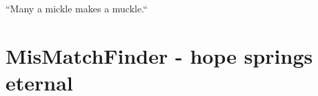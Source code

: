 
\begin{savequote}[65mm]
``Many a mickle makes a muckle.``
\end{savequote}


\chapter[Mismatchfinder]{MisMatchFinder - hope springs eternal}
\label{ch:mmf}




